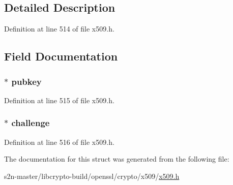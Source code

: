 \subsection{Detailed Description}


Definition at line 514 of file x509.\+h.



\subsection{Field Documentation}
\subsubsection[{\texorpdfstring{pubkey}{pubkey}}]{ $\ast$ pubkey}\hypertarget{struct_netscape__spkac__st_a7b1b003230ee0d158404d0ff7a4d120c}{}\label{struct_netscape__spkac__st_a7b1b003230ee0d158404d0ff7a4d120c}


Definition at line 515 of file x509.\+h.

\subsubsection[{\texorpdfstring{challenge}{challenge}}]{ $\ast$ challenge}\hypertarget{struct_netscape__spkac__st_a77dda55d9604b00dde3fb4091be4fcaf}{}\label{struct_netscape__spkac__st_a77dda55d9604b00dde3fb4091be4fcaf}


Definition at line 516 of file x509.\+h.



The documentation for this struct was generated from the following file\+:\begin{DoxyCompactItemize}
\item 
s2n-\/master/libcrypto-\/build/openssl/crypto/x509/\hyperlink{crypto_2x509_2x509_8h}{x509.\+h}\end{DoxyCompactItemize}
